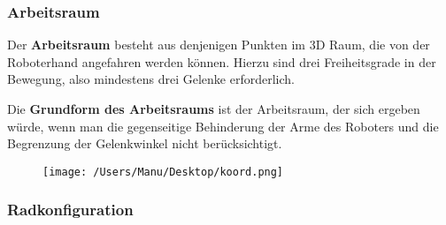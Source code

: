 \documentclass[paper=a4, fontsize=11pt]{scrartcl} %
\numberwithin{equation}{section} %
\numberwithin{figure}{section} %
\numberwithin{table}{section} %
\begin{document}
\subsubsection{Arbeitsraum}

Der \textbf{Arbeitsraum} besteht aus denjenigen Punkten im 3D Raum, die von der Roboterhand angefahren werden können. Hierzu sind drei Freiheitsgrade in der Bewegung, also mindestens drei Gelenke erforderlich.

Die \textbf{Grundform des Arbeitsraums} ist der Arbeitsraum, der sich ergeben würde, wenn man die gegenseitige Behinderung der Arme des Roboters und die Begrenzung der Gelenkwinkel nicht berücksichtigt.

\begin{figure}
    \centering
    \texttt{[image: /Users/Manu/Desktop/koord.png]}
\end{figure}

\subsubsection{Radkonfiguration}
\end{document}
